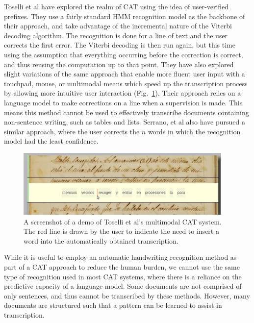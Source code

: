 \documentclass[ms]{byuprop}
\begin{document}
Toselli et al\cite{Toselli2007} have explored the realm of CAT using the idea of user-verified prefixes. They use a fairly standard HMM recognition model as the backbone of their approach, and take advantage of the incremental nature of the Viterbi decoding algorithm. The recognition is done for a line of text and the user corrects the first error. The Viterbi decoding is then run again, but this time using the assumption that everything occurring before the correction is correct, and thus reusing the computation up to that point. They have also explored slight variations of the same approach that enable more fluent user input with a touchpad\cite{Toselli2008}, mouse\cite{Toselli2009}, or multimodal means\cite{Toselli2010} which speed up the transcription process by allowing more intuitive user interaction (Fig.~\ref{fig:Toselli_multimodalCAT}). Their approach relies on a language model to make corrections on a line when a supervision is made. This means this method cannot be used to effectively transcribe documents containing non-sentence writing, such as tables and lists. Serrano, et al also have pursued a similar approach, where the user corrects the $n$ words in which the recognition model had the least confidence\cite{Serrano2014}.

\begin{figure}
    \centering
    \includegraphics[width=0.95\textwidth]{Toselli_multimodalCAT}
    \caption{A screenshot of a demo of Toselli et al's multimodal CAT system. The red line is drawn by the user to indicate the need to insert a word into the automatically obtained transcription.}
    \label{fig:Toselli_multimodalCAT}
\end{figure}

While it is useful to employ an automatic handwriting recognition method as part of a CAT approach to reduce the human burden, we cannot use the same type of recognition used in most CAT systems, where there is a reliance on the predictive capacity of a language model. Some documents are not comprised of only sentences, and thus cannot be transcribed by these methods. However, many documents are structured such that a pattern can be learned to assist in transcription.
\end{document}
